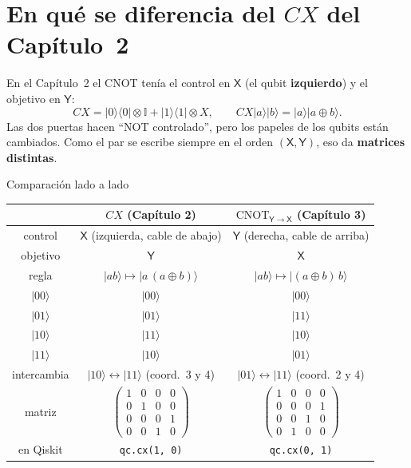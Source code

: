 \documentclass[11pt, a4paper, twoside, openright]{report}
\newenvironment{bloque}{\par\noindent\begin{minipage}{\linewidth}\setlength{\parskip}{4pt}}{\end{minipage}\par\medskip}
\providecommand{\ket}[1]{|#1\rangle}
\providecommand{\bra}[1]{\langle #1|}
\newcommand{\X}{\mathsf{X}}
\newcommand{\Y}{\mathsf{Y}}
\newcommand{\CYX}{\mathrm{CNOT}_{\Y\to\X}}
\newcommand{\I}{\mathbb{I}}
\begin{document}
\section{En qué se diferencia del $CX$ del Capítulo~2}\label{sec:cx}

\begin{bloque}
En el Capítulo~2 el CNOT tenía el control en $\X$ (el qubit \textbf{izquierdo}) y el objetivo en $\Y$:
\[
CX=\ket0\bra0\otimes\I+\ket1\bra1\otimes X,\qquad CX\ket a\ket b=\ket a\ket{a\oplus b}.
\]
Las dos puertas hacen ``NOT controlado'', pero los papeles de los qubits están cambiados. Como el par se escribe siempre en el orden $(\X,\Y)$, eso da \textbf{matrices distintas}.
\end{bloque}

\begin{aclaracion}{Comparación lado a lado}
\centering
\renewcommand{\arraystretch}{1.3}
\begin{tabular}{c|c|c}
 & $CX$ (Capítulo 2) & $\CYX$ (Capítulo 3)\\ \hline
control & $\X$ (izquierda, cable de abajo) & $\Y$ (derecha, cable de arriba)\\
objetivo & $\Y$ & $\X$\\
regla & $\ket{ab}\mapsto\ket{a\,(a\oplus b)}$ & $\ket{ab}\mapsto\ket{(a\oplus b)\,b}$\\
$\ket{00}$ & $\ket{00}$ & $\ket{00}$\\
$\ket{01}$ & $\ket{01}$ & $\ket{11}$\\
$\ket{10}$ & $\ket{11}$ & $\ket{10}$\\
$\ket{11}$ & $\ket{10}$ & $\ket{01}$\\
intercambia & $\ket{10}\leftrightarrow\ket{11}$ (coord.\ 3 y 4) & $\ket{01}\leftrightarrow\ket{11}$ (coord.\ 2 y 4)\\[4pt]
matriz &
$\begin{pmatrix} 1&0&0&0\\0&1&0&0\\0&0&0&1\\0&0&1&0\end{pmatrix}$ &
$\begin{pmatrix} 1&0&0&0\\0&0&0&1\\0&0&1&0\\0&1&0&0\end{pmatrix}$\\[18pt]
en Qiskit & \texttt{qc.cx(1, 0)} & \texttt{qc.cx(0, 1)}
\end{tabular}
\end{aclaracion}
\end{document}
